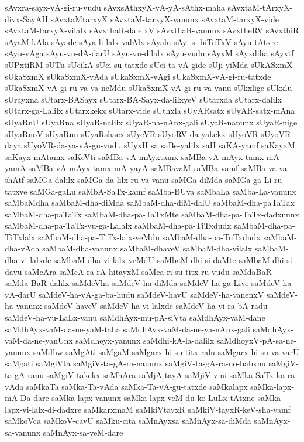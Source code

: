 {sAvxra-sayx-vA-gi-ru-vudu
sAvxsAthxyX-yA-yA-sAthx-maha
sAvxtaM-tArxyX-divx-SayAH
sAvxtaMtarxyX
sAvxtaM-tarxyX-vanunx
sAvxtaM-tarxyX-vide
sAvxtaM-tarxyX-vilalx
sAvxthaR-dalelxV
sAvxthaR-vanunx
sAvxtheRV
sAvxthiR
sAyaM-kAla
sAyade
sAya-li-lalx-valAlx
sAyalu
sAyi-si-biTeTxV
sAyu-tAtxre
sAyu-vAga
sAyu-vu-dA-darU
sAyu-vu-dilalx
sAyu-vudu
sAyxM
sAyxdiha
sAyxtf
sUPxtiRM
sUTu
sUcikA
sUci-su-tatxde
sUci-ta-vA-gide
sUji-yiMda
sUkASxmX
sUkaSxmX
sUkaSxmX-vAda
sUkaSxmX-vAgi
sUkaSxmX-vA-gi-ru-tatxde
sUkaSxmX-vA-gi-ru-va-va-neMdu
sUkaSxmX-vA-gi-ru-va-vanu
sUkxlige
sUkxlu
sUrayxna
sUtarx-BASayx
sUtarx-BA-Sayx-da-lilxyeV
sUtarxda
sUtarx-dalilx
sUtarx-ga-Lalilx
sUtarxkekx
sUtarx-vide
sUthxla
sUyARsatx
sUyAR-satx-mAna
sUyaRnU
sUyaRna
sUyaR-nalilx
sUyaR-na-nAnx-gali
sUyaR-nanunx
sUyaR-nige
sUyaRnoV
sUyaRnu
sUyaRshacx
sUyeVR
sUyoRV-da-yakekx
sUyoVR
sUyoVR-daya
sUyoVR-da-ya-vA-gu-vudu
sUyxH
sa
saBe-yalilx
saH
saKA-yamf
saKayxM
saKayx-mAtamx
saKeVti
saMBa-vA-mAyxtamx
saMBa-vA-mAyx-tamx-mA-yamA
saMBa-vA-mAyx-tamx-mA-yayA
saMBavaM
saMBa-vamf
saMBa-va-va-shAtf
saMGa-dalilx
saMGa-da-lilx-ru-va-vanu
saMGa-diMda
saMGa-ga-Li-ru-tatxve
saMGa-gaLu
saMbA-SaTx-kamf
saMba-BUva
saMbaLa
saMba-La-vanunx
saMbaMdha
saMbaM-dha-diMda
saMbaM-dha-diM-dalU
saMbaM-dha-paTaTax
saMbaM-dha-paTaTx
saMbaM-dha-pa-TaTxMte
saMbaM-dha-pa-TaTx-dadxnunx
saMbaM-dha-pa-TaTx-vu-ga-Lalalx
saMbaM-dha-pa-TiTxdudx
saMbaM-dha-pa-TiTxlalx
saMbaM-dha-pa-TiTx-lalx-veMdu
saMbaM-dha-pa-TuTxdudx
saMbaM-dha-vAda
saMbaM-dha-vanunx
saMbaM-dhaveV
saMbaM-dha-vilalx
saMbaM-dha-vi-lalxde
saMbaM-dha-vi-lalx-veMdU
saMbaM-dhi-si-daMte
saMbaM-dhi-si-davu
saMcAra
saMcA-ra-rA-hitayxM
saMca-ri-su-titx-ru-vudu
saMdaBaR
saMda-BaR-dalilx
saMdeVha
saMdeV-ha-diMda
saMdeV-ha-ga-Live
saMdeV-ha-vA-darU
saMdeV-ha-vA-ga-ba-hudu
saMdeV-havU
saMdeV-ha-vanenxV
saMdeV-ha-vanunx
saMdeV-haveV
saMdeV-ha-vi-lalxde
saMdeV-ha-vi-ra-bA-radu
saMdeV-ha-vu-LaLx-vanu
saMdhAyx-mu-pA-siVta
saMdhAyx-vaM-dane
saMdhAyx-vaM-da-ne-yaM-taha
saMdhAyx-vaM-da-ne-ya-nAnx-gali
saMdhAyx-vaM-da-ne-yanUnx
saMdheyx-yanunx
saMdhi-kA-la-dalilx
saMdhoyxV-pA-sa-ne-yanunx
saMdhw
saMgAti
saMgaM
saMgarx-hi-su-titx-ralu
saMgarx-hi-su-va-varU
saMgati
saMgiVta
saMgiV-ta-gA-ra-nanunx
saMgiV-ta-gA-ra-no-babxnu
saMgiV-ta-gA-ranu
saMgiV-takekx
saMhAra
saMjA-tayA
saMjiV-vini
saMka-SaTx-ka-ra-vAda
saMkaTa
saMka-Ta-vAda
saMka-Ta-vA-gu-tatxde
saMkalapx
saMka-lapx-mA-Da-dare
saMka-lapx-vanunx
saMka-lapx-veM-du-ko-LuLx-tAtxne
saMka-lapx-vi-lalx-di-dadxre
saMkarxmaM
saMkiVtayxR
saMkiV-tayxR-keV-sha-vamf
saMkoVca
saMkoV-cavU
saMku-cita
saMnAyxsa
saMnAyx-sa-diMda
saMnAyx-sa-vanunx
saMnAyx-sa-veM-dare
}
